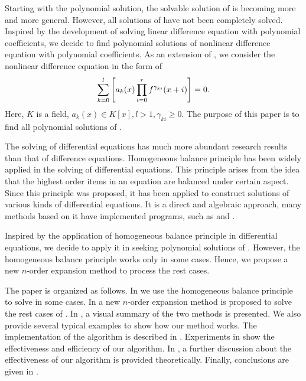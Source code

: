 Starting with the polynomial solution, the solvable solution of  is becoming more and more general. However, all solutions of  have not been completely solved. Inspired by the development of solving linear difference equation with polynomial coefficients, we decide to find polynomial solutions of nonlinear difference equation with polynomial coefficients. As an extension of , we consider the nonlinear difference equation in the form of
\begin{equation}
\sum_{k=0}^l{\left[a_k(x)\prod_{i=0}^r{f^{\gamma_{ki}}(x+i)}\right]}=0.
\label{eq}
\end{equation}
Here, $K$ is a field,  $a_k(x)\in K[x], l>1, \gamma_{ki}\ge 0$. The purpose of this paper is to find all polynomial solutions of .

The solving of differential equations has much more abundant research results than that of difference equations. Homogeneous balance principle has been widely applied in the solving of differential equations. This principle arises from the idea that the highest order items in an equation are balanced under certain aspect. Since this principle was proposed\citep{wang1995solitary,wang1996application}, it has been applied to construct solutions of various kinds of differential equations\citep{hbAppl2006,hbAppl2009a,hbAppl2009b,hbAppl2010}. It is a direct and algebraic approach, many methods based on it have implemented programs, such as \cite{li2002rath} and \cite{li2004raeem}.

Inspired by the application of homogeneous balance principle in differential equations, we decide to apply it in seeking polynomial solutions of . However, the homogeneous balance principle works only in some cases. Hence, we propose a new $n$-order expansion method to process the rest cases.

The paper is organized as follows. In  we use the homogeneous balance principle to solve  in some cases. In  a new $n$-order expansion method is proposed to solve the rest cases of . In , a visual summary of the two methods is presented. We also provide several typical examples to show how our method works. The implementation of the algorithm is described in . Experiments in  show the effectiveness and efficiency of our algorithm. In ,  a further discussion about the effectiveness of our algorithm is provided theoretically. Finally, conclusions are given in .


